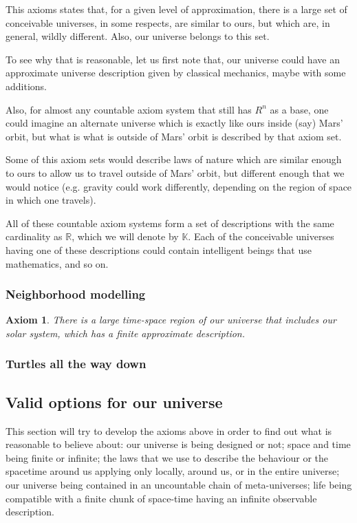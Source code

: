 \documentclass[a4paper
,draft
]{article}
\def\reale{\mathbb{R}}
\def\descriptions{\mathbb{K}}
\newtheorem{axiom}{Axiom}
\begin{document}
This axioms states that, for a given level of approximation,
there is a large set of conceivable universes, in some respects,
are similar to ours, but which are, in general, wildly different.
Also, our universe belongs to this set.

To see why that is reasonable, let us first note that,
our universe could have an approximate universe description
given by classical mechanics, maybe with some additions.

Also, for almost any countable axiom system that still
has $R^n$ as a base, one could imagine an alternate universe
which is exactly like ours inside (say) Mars' orbit,
but what is what is outside of Mars' orbit is described by that axiom set.

Some of this axiom sets would describe laws of nature which are similar enough
to ours to allow us to travel outside of Mars' orbit, but different enough that
we would notice (e.g. gravity could work differently, depending on the region
of space in which one travels).

All of these countable axiom systems form a set of descriptions
with the same cardinality as $\reale$, which we will
denote by $\descriptions$. Each of the conceivable universes
having one of these descriptions could contain intelligent beings that use
mathematics, and so on.

\subsubsection{Neighborhood modelling}

\begin{axiom}\label{finiteneighborhood}
  There is a large time-space region of our universe that includes our solar
  system, which has a finite approximate description.
\end{axiom}

\subsubsection{Turtles all the way down}

\subsection{Valid options for our universe}

This section will try to develop the axioms above in order to find out what
is reasonable to believe about: our universe is being designed or not;
space and time being finite or infinite; the laws that we use to describe
the behaviour or the spacetime around us applying only locally, around us,
or in the entire universe;
our universe being contained in an uncountable chain of meta-universes;
life being
compatible with a finite chunk of space-time having an infinite
observable description.
\end{document}
